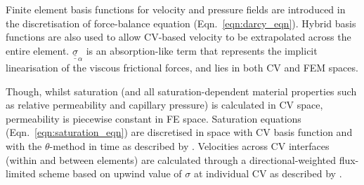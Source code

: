 \documentclass[preprint,authoryear,12pt]{elsarticle}
\begin{document}





Finite element basis functions for velocity and pressure fields are introduced in the discretisation of force-balance equation (Eqn.~\ref{eqn:darcy_eqn}). Hybrid basis functions are also used to allow CV-based velocity to be extrapolated across the entire element. $\underline{\underline{\sigma}}_{\alpha}$ is an absorption-like term that represents the implicit linearisation of the viscous frictional forces, and lies in both CV and FEM spaces.

\medskip
Though, whilst saturation (and all saturation-dependent material properties such as relative permeability and capillary pressure) is calculated in CV space, permeability is piecewise constant in FE space. Saturation equations (Eqn.~\ref{eqn:saturation_eqn}) are discretised in space with CV basis function and with the $\theta$-method in time as described by \citet{gomes_book_2012}. Velocities across CV interfaces (within and between elements) are calculated through a directional-weighted flux-limited scheme based on upwind value of $\sigma$ at individual CV as described by \citet{jackson_2013}.
\end{document}
